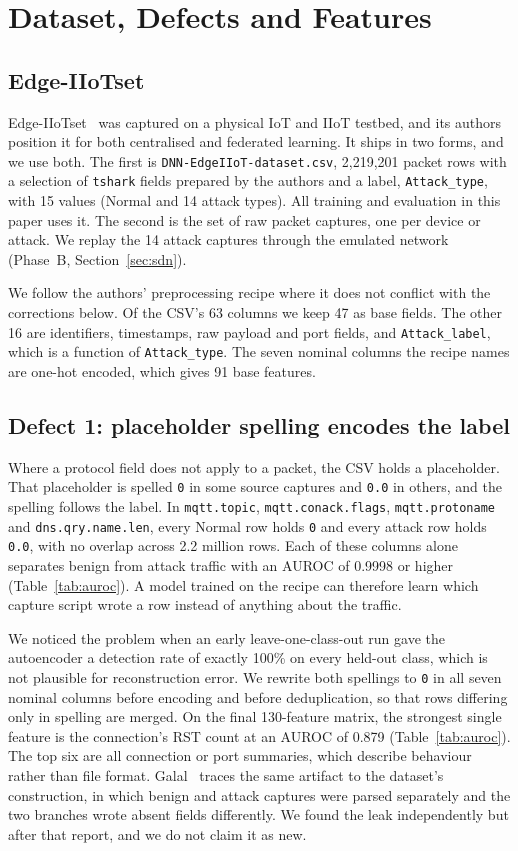 \section{Dataset, Defects and Features}
\label{sec:data}
\subsection{Edge-IIoTset}
Edge-IIoTset~\cite{ferrag2022} was captured on a physical IoT and IIoT testbed, and its authors position it for both centralised and federated learning. It ships in two forms, and we use both. The first is \texttt{DNN-EdgeIIoT-dataset.csv}, 2,219,201 packet rows with a selection of \texttt{tshark} fields prepared by the authors and a label, \texttt{Attack\_type}, with 15 values (Normal and 14 attack types). All training and evaluation in this paper uses it. The second is the set of raw packet captures, one per device or attack. We replay the 14 attack captures through the emulated network (Phase~B, Section~\ref{sec:sdn}).

We follow the authors' preprocessing recipe where it does not conflict with the corrections below. Of the CSV's 63 columns we keep 47 as base fields. The other 16 are identifiers, timestamps, raw payload and port fields, and \texttt{Attack\_label}, which is a function of \texttt{Attack\_type}. The seven nominal columns the recipe names are one-hot encoded, which gives 91 base features.

\subsection{Defect 1: placeholder spelling encodes the label}
\label{sec:defects}
Where a protocol field does not apply to a packet, the CSV holds a placeholder. That placeholder is spelled \texttt{0} in some source captures and \texttt{0.0} in others, and the spelling follows the label. In \texttt{mqtt.topic}, \texttt{mqtt.conack.flags}, \texttt{mqtt.protoname} and \texttt{dns.qry.name.len}, every Normal row holds \texttt{0} and every attack row holds \texttt{0.0}, with no overlap across 2.2 million rows. Each of these columns alone separates benign from attack traffic with an AUROC of 0.9998 or higher (Table~\ref{tab:auroc}). A model trained on the recipe can therefore learn which capture script wrote a row instead of anything about the traffic.

We noticed the problem when an early leave-one-class-out run gave the autoencoder a detection rate of exactly 100\% on every held-out class, which is not plausible for reconstruction error. We rewrite both spellings to \texttt{0} in all seven nominal columns before encoding and before deduplication, so that rows differing only in spelling are merged. On the final 130-feature matrix, the strongest single feature is the connection's RST count at an AUROC of 0.879 (Table~\ref{tab:auroc}). The top six are all connection or port summaries, which describe behaviour rather than file format. Galal~\cite{galal2026} traces the same artifact to the dataset's construction, in which benign and attack captures were parsed separately and the two branches wrote absent fields differently. We found the leak independently but after that report, and we do not claim it as new.

